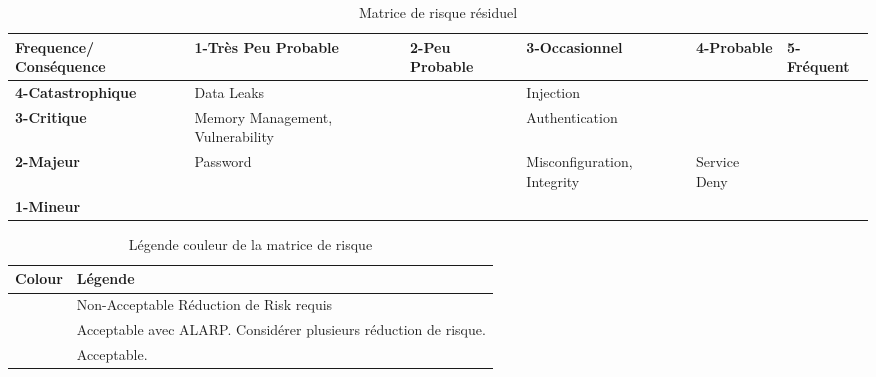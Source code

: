 \documentclass[12pt]{article}
\begin{document}
\begin{table}[H]
\centering
\scriptsize
\begin{tabular}{|p{2cm}|p{2cm}|p{2cm}| p{2cm} |p{2cm}| p{2cm}|}
\hline \bf Frequence/ Conséquence & \bf 1-Très Peu Probable & \bf 2-Peu Probable & \bf 3-Occasionnel & \bf 4-Probable & \bf 5-Fréquent\\ [10pt]
\hline \bf 4-Catastrophique &  Data Leaks \cellcolor{yellow!50} &\cellcolor{red!50} & Injection\cellcolor{red!50} & \cellcolor{red!50} &\cellcolor{red!50} \\ [10pt]
\hline \bf 3-Critique &Memory Management, Vulnerability\cellcolor{green!50} & \cellcolor{yellow!50} & Authentication \cellcolor{yellow!50} & \cellcolor{red!50} &\cellcolor{red!50} \\ [10pt]
\hline \bf 2-Majeur & Password\cellcolor{green!50} & \cellcolor{green!50} & Misconfiguration, Integrity\cellcolor{yellow!50} &Service Deny\cellcolor{yellow!50} &\cellcolor{red!50} \\ [10pt]
\hline \bf 1-Mineur & \cellcolor{green!50} & \cellcolor{green!50} & \cellcolor{green!50} &\cellcolor{yellow!50} &\cellcolor{yellow!50} \\ [10pt]
\hline
\end{tabular} 
\caption{Matrice de risque résiduel}
\end{table}

 

\begin{table}[H]
\centering
\begin{tabular}{|p{2cm}|p{10cm}|}
\hline \bf Colour & \bf Légende \\
\hline \cellcolor{red! 50} & Non-Acceptable Réduction de Risk requis \\ [10pt]
\hline \cellcolor{yellow! 50} & Acceptable avec ALARP. Considérer plusieurs réduction de risque. \\[10pt]
\hline \cellcolor{green! 50} & Acceptable. \\ [10pt]
\hline
\end{tabular}
\caption{Légende couleur de la matrice de risque}
\end{table}
\end{document}
